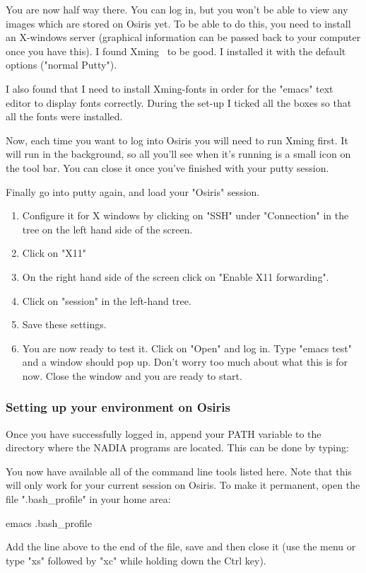 \documentclass[]{nadia}
\begin{document}
You are now half way there. You can log in, but you won't be able to
view any images which are stored on Osiris yet. To be able to do this,
you need to install an X-windows server (graphical information can be
passed back to your computer once you have this). I found
Xming~\cite{xming} to be good. I installed it with the default options
("normal Putty").

I also found that I need to install Xming-fonts in order for the
"emacs" text editor to display fonts correctly. During the set-up I
ticked all the boxes so that all the fonts were installed.

Now, each time you want to log into Osiris you will need to run Xming
first. It will run in the background, so all you'll see when it's
running is a small icon on the tool bar. You can close it once you've
finished with your putty session.

Finally go into putty again, and load your "Osiris" session. 
\begin{enumerate}
\item Configure it for X windows by clicking on "SSH" under "Connection" in the tree on the left hand side of the screen. 
\item Click on "X11" 
\item On the right hand side of the screen click on "Enable X11 forwarding". 
\item Click on "session" in the left-hand tree. 
\item Save these settings. 
\item You are now ready to test it. Click on "Open" and log in. Type
  "emacs test" and a window should pop up. Don't worry too much about
  what this is for now. Close the window and you are ready to start.
\end{enumerate}

\subsubsection{Setting up your environment on Osiris}
\label{osiris-setup}
Once you have successfully logged in, append your PATH variable to the
directory where the NADIA programs are located. This can be done by
typing:

You now have available all of the command line tools listed here. Note
that this will only work for your current session on Osiris. To make
it permanent, open the file ".bash\_profile" in your home area:
\begin{myverbatim}
  emacs .bash_profile 
\end{myverbatim}
Add the line above to the end of the file, save and then close it (use
the menu or type "xs" followed by "xc" while holding down the Ctrl
key).
\end{document}
